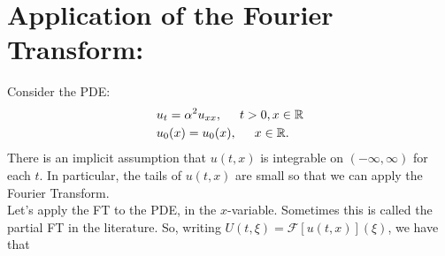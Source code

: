 \documentclass{article}
\theoremstyle{definition}
\newcommand{\R}{\mathbb{R}}
\newcommand{\F}{\mathcal{F}}
\newcommand{\ift}{\infty}
\begin{document}
\newpage





\section{Application of the Fourier Transform:}

Consider the PDE:
\begin{align*}
&u_t = \alpha^2 u_{xx}, \hspace{0.5cm} t>0, x\in \R\\
&u_0(x) = u_0(x), \hspace{0.5cm} x\in \R.
\end{align*}
There is an implicit assumption that $u(t,x)$ is integrable on $(-\ift, \ift)$ for each $t$. In particular, the tails of $u(t,x)$ are small so that we can apply the Fourier Transform.\\

Let's apply the FT to the PDE, in the $x$-variable. Sometimes this is called the partial FT in the literature. So, writing $U(t,\xi) = \F[u(t,x)](\xi)$, we have that
\end{document}
